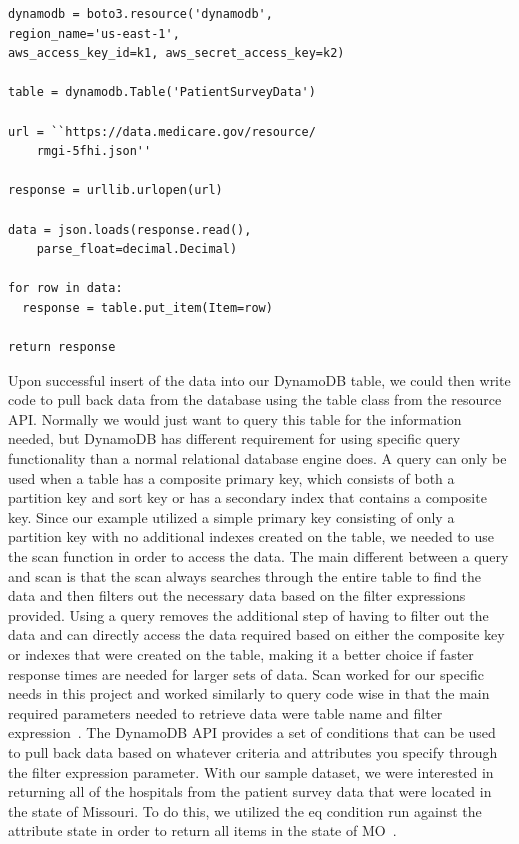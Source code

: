 \begin{verbatim}
dynamodb = boto3.resource('dynamodb', 
region_name='us-east-1', 
aws_access_key_id=k1, aws_secret_access_key=k2)

table = dynamodb.Table('PatientSurveyData')

url = ``https://data.medicare.gov/resource/
	rmgi-5fhi.json''

response = urllib.urlopen(url)

data = json.loads(response.read(), 
	parse_float=decimal.Decimal)

for row in data:
  response = table.put_item(Item=row)

return response
\end{verbatim}

Upon successful insert of the data into our DynamoDB table, we could then 
write code to pull back data from the database using the table class from 
the resource API. Normally we would just want to query this table for the 
information needed, but DynamoDB has different requirement for using specific 
query functionality than a normal relational database engine does. A query can 
only be used when a table has a composite primary key, which consists of both 
a partition key and sort key or has a secondary index that contains a 
composite key. Since our example utilized a simple primary key consisting of 
only a partition key with no additional indexes created on the table, we 
needed to use the scan function in order to access the data. The main 
different between a query and scan is that the scan always searches through 
the entire table to find the data and then filters out the necessary data 
based on the filter expressions provided. Using a query removes the additional 
step of having to filter out the data and can directly access the data 
required based on either the composite key or indexes that were created on the 
table, making it a better choice if faster response times are needed for 
larger sets of data. Scan worked for our specific needs in this project and 
worked similarly to query code wise in that the main required parameters 
needed to retrieve data were table name and filter 
expression~\cite{hid-sp18-521-botodynamodb}. The DynamoDB API provides a set 
of conditions that can be used to pull back data based on whatever criteria 
and attributes you specify through the filter expression parameter. With our 
sample dataset, we were interested in returning all of the hospitals from the 
patient survey data that were located in the state of Missouri. To do this, we 
utilized the eq condition run against the attribute state in order to return 
all items in the state of MO~\cite{hid-sp18-521-boto-dynamodbconditions}.  

